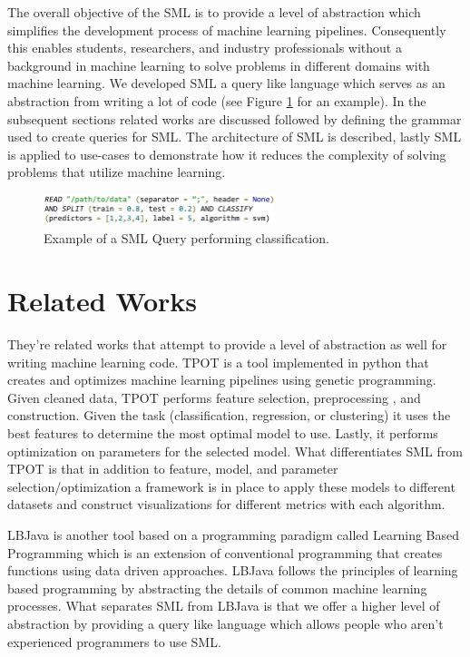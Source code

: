 \documentclass[jair,twoside,11pt,theapa]{article}
\begin{document}
The overall objective of the SML is to provide a level of abstraction which simplifies the development process of machine learning pipelines. Consequently this enables students, researchers, and industry professionals without a background in machine learning to solve problems in different domains with machine learning. We developed SML a query like language which serves as an abstraction from writing a lot of code (see Figure \ref{fig:sml-ex-1} for an example). In the subsequent sections related works are discussed followed by defining the grammar used to create queries for SML. The architecture of SML is described, lastly SML is applied to use-cases to demonstrate how it reduces the complexity of solving problems that utilize machine learning.

\begin{figure}
\includegraphics[width=0.6\textwidth]{figs/sml-ex-1.png}
\centering
\caption{Example of a SML Query performing classification.}
\label{fig:sml-ex-1}
\end{figure}

\section{Related Works}
\label{RelatedWorks}

They're related works that attempt to provide a level of abstraction as well for writing machine learning code. TPOT \cite{TPOT} is a tool implemented in python that creates and optimizes machine learning pipelines using genetic programming. Given cleaned data, TPOT performs feature selection, preprocessing , and construction. Given the task (classification, regression, or clustering) it uses the best features to determine the most optimal model to use. Lastly, it performs optimization on parameters for the selected model. What differentiates SML from TPOT is that in addition to feature, model, and parameter selection/optimization a framework is in place to apply these models to different datasets and construct visualizations for different metrics with each algorithm.

LBJava \cite{RizzoloRo10} is another tool  based on a programming paradigm called Learning Based Programming \cite{Roth05} which is an extension of conventional programming that creates functions using data driven approaches. LBJava follows the principles of learning based programming by abstracting the details of common machine learning processes. What separates SML from LBJava is that we offer a higher level of abstraction by providing a query like language which allows people who aren't experienced programmers to use SML.
\end{document}
